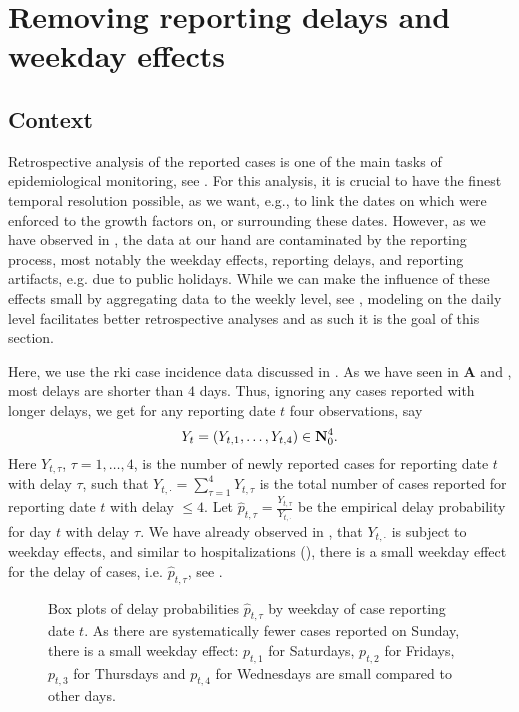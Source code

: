 \section{Removing reporting delays and weekday effects}%
\label{sec:model_reporting_delay}
\subsection{Context}
Retrospective analysis of the reported cases is one of the main tasks of epidemiological monitoring, see . For this analysis, it is crucial to have the finest temporal resolution possible, as we want, e.g., to link the dates on which  were enforced to the growth factors on, or surrounding these dates. However, as we have observed in , the data at our hand are contaminated by the reporting process, most notably the weekday effects, reporting delays, and reporting artifacts, e.g. due to public holidays.
While we can make the influence of these effects small by aggregating data to the weekly level, see , modeling on the daily level facilitates better retrospective analyses and as such it is the goal of this section.

Here, we use the \acrshort{rki} case incidence data discussed in . As we have seen in  \textbf{A} and , most delays are shorter than $4$ days. Thus, ignoring any cases reported with longer delays, we get for any reporting date $t$ four observations, say 
$$
    Y_{t} = \left( Y_{t, 1}, \dots, Y_{t, 4} \right) \in \mathbf N^{4}_{0}.
$$
Here $Y_{t,\tau}$, $\tau = 1, \dots, 4$, is the number of newly reported cases for reporting date $t$ with delay $\tau$, such that $Y_{t,\cdot} = \sum_{\tau = 1}^4 Y_{t, \tau}$ is the total number of cases reported for reporting date $t$ with delay $\leq 4$. 
Let $\hat p_{t, \tau} = \frac{Y_{t,\tau}}{Y_{t,\cdot}}$ be the empirical delay probability for day $t$ with delay $\tau$. We have already observed in , that $Y_{t, \cdot}$ is subject to weekday effects, and similar to hospitalizations (), there is a small weekday effect for the delay of cases, i.e. $\hat p_{t,\tau}$, see . 

\begin{figure}
    \resizebox{\textwidth}{!}{%
    }
    \caption{Box plots of delay probabilities $\hat p_{t,\tau}$ by weekday of case reporting date $t$. As there are systematically fewer cases reported on Sunday, there is a small weekday effect: $p_{t,1}$ for Saturdays, $p_{t,2}$ for Fridays, $p_{t,3}$ for Thursdays and $p_{t,4}$ for Wednesdays are small compared to other days.}
    \label{fig:weekday_effect_delays}
\end{figure}

